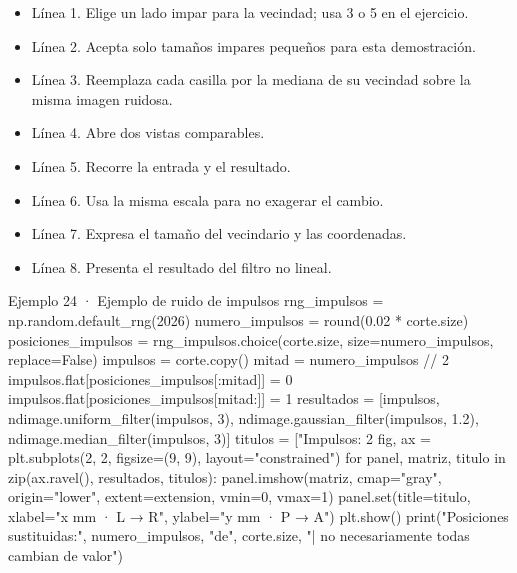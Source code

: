 
\begin{itemize}

\item Línea 1. Elige un lado impar para la vecindad; usa 3 o 5 en el ejercicio.

\item Línea 2. Acepta solo tamaños impares pequeños para esta demostración.

\item Línea 3. Reemplaza cada casilla por la mediana de su vecindad sobre la misma imagen ruidosa.

\item Línea 4. Abre dos vistas comparables.

\item Línea 5. Recorre la entrada y el resultado.

\item Línea 6. Usa la misma escala para no exagerar el cambio.

\item Línea 7. Expresa el tamaño del vecindario y las coordenadas.

\item Línea 8. Presenta el resultado del filtro no lineal.

\end{itemize}

\begin{Codigo}{Ejemplo 24 · Ejemplo de ruido de impulsos}
rng_impulsos = np.random.default_rng(2026)
numero_impulsos = round(0.02 * corte.size)
posiciones_impulsos = rng_impulsos.choice(corte.size, size=numero_impulsos, replace=False)
impulsos = corte.copy()
mitad = numero_impulsos // 2
impulsos.flat[posiciones_impulsos[:mitad]] = 0
impulsos.flat[posiciones_impulsos[mitad:]] = 1
resultados = [impulsos, ndimage.uniform_filter(impulsos, 3), ndimage.gaussian_filter(impulsos, 1.2), ndimage.median_filter(impulsos, 3)]
titulos = ["Impulsos: 2%
fig, ax = plt.subplots(2, 2, figsize=(9, 9), layout="constrained")
for panel, matriz, titulo in zip(ax.ravel(), resultados, titulos):
    panel.imshow(matriz, cmap="gray", origin="lower", extent=extension, vmin=0, vmax=1)
    panel.set(title=titulo, xlabel="x mm · L → R", ylabel="y mm · P → A")
plt.show()
print("Posiciones sustituidas:", numero_impulsos, "de", corte.size, "| no necesariamente todas cambian de valor")
\end{Codigo}

